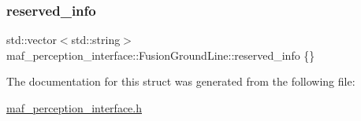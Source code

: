 \subsubsection{\texorpdfstring{reserved\+\_\+info}{reserved\_info}}
{\footnotesize\ttfamily std\+::vector$<$std\+::string$>$ maf\+\_\+perception\+\_\+interface\+::\+Fusion\+Ground\+Line\+::reserved\+\_\+info \{\}}



The documentation for this struct was generated from the following file\+:\begin{DoxyCompactItemize}
\item 
\hyperlink{maf__perception__interface_8h}{maf\+\_\+perception\+\_\+interface.\+h}\end{DoxyCompactItemize}
